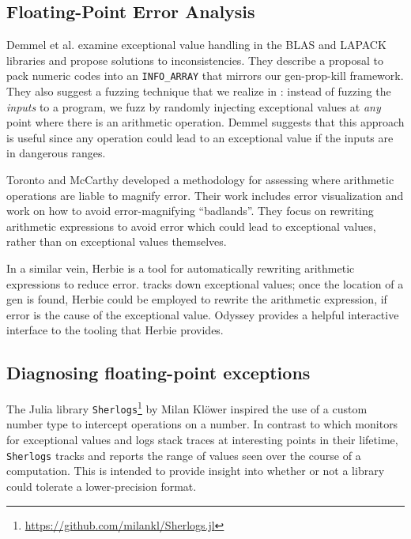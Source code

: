 \documentclass{juliacon}
\begin{document}
\subsection{Floating-Point Error Analysis}

Demmel et al.\cite{ddghlllprr-correctness-2022} examine \fp{} exceptional value handling in the BLAS and LAPACK libraries and propose solutions to inconsistencies.
They describe a proposal to pack numeric codes into an \texttt{INFO\_ARRAY} that mirrors our gen-prop-kill framework.
They also suggest a fuzzing technique that we realize in \FT{}:
instead of fuzzing the \emph{inputs} to a program, we fuzz by randomly injecting exceptional values at \emph{any} point where there is an arithmetic operation. Demmel suggests that this approach is useful since any \fp{} operation could lead to an exceptional value if the inputs are in dangerous ranges.

Toronto and McCarthy\cite{torontoPracticallyAccurateFloatingPoint2014} developed a methodology for assessing where arithmetic operations are liable to magnify \fp{} error.
Their work includes error visualization and work on how to avoid error-magnifying ``badlands''.
They focus on rewriting arithmetic expressions to avoid error which could lead to exceptional values, rather than on exceptional values themselves.

In a similar vein, Herbie\cite{panchekhaAutomaticallyImprovingAccuracy2015} is a tool for automatically rewriting arithmetic expressions to reduce \fp{} error.
\FT{} tracks down exceptional \fp{} values; once the location of a gen is found, Herbie could be employed to rewrite the arithmetic expression, if \fp{} error is the cause of the exceptional value.
Odyssey\cite{misbackOdysseyInteractiveWorkbench2023} provides a helpful interactive interface to the tooling that Herbie provides.

\subsection{Diagnosing floating-point exceptions}

The Julia library \texttt{Sherlogs}\footnote{\url{https://github.com/milankl/Sherlogs.jl}} by Milan Klöwer inspired the use of a custom number type to intercept operations on a number.
In contrast to \FT{} which monitors for exceptional values and logs stack traces at interesting points in their lifetime, \texttt{Sherlogs} tracks and reports the range of values seen over the course of a computation.
This is intended to provide insight into whether or not a library could tolerate a lower-precision \fp{} format.
\end{document}
